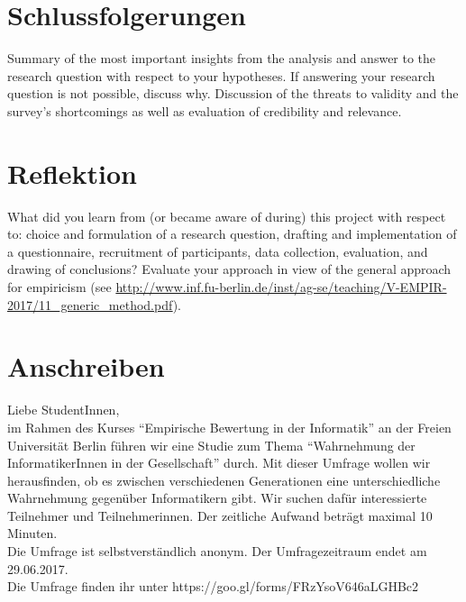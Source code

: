 \documentclass[de]{agse-empir-report}\usepackage[]{graphicx}\usepackage[]{color}
\begin{document}
\section[]{Schlussfolgerungen} \label{sec:schlussfolgerung}
Summary of the most important insights from the analysis and
answer to the research question with respect to your hypotheses.
If answering your research question is not possible, discuss why.
Discussion of the threats to validity and the survey's
shortcomings as well as evaluation of credibility and relevance.


\section[]{Reflektion} \label{sec:reflektion}

What did you learn from (or became aware of during) this project with
respect to: choice and formulation of a research question,
drafting and implementation of a questionnaire,
recruitment of participants,
data collection, evaluation, and drawing of conclusions?
Evaluate your approach in view of the general approach for
empiricism (see
\url{http://www.inf.fu-berlin.de/inst/ag-se/teaching/V-EMPIR-2017/11_generic_method.pdf}).


\nocite{*}




\appendix

\section{Anschreiben}

Liebe StudentInnen,\\
im Rahmen des Kurses “Empirische Bewertung in der Informatik” an der Freien Universität Berlin führen wir eine Studie zum Thema “Wahrnehmung der InformatikerInnen in der Gesellschaft” durch. Mit dieser Umfrage wollen wir herausfinden, ob es zwischen verschiedenen Generationen eine unterschiedliche Wahrnehmung gegenüber Informatikern gibt. Wir suchen dafür interessierte Teilnehmer und Teilnehmerinnen. Der zeitliche Aufwand beträgt maximal 10 Minuten.\\
Die Umfrage ist selbstverständlich anonym. Der Umfragezeitraum endet am 29.06.2017.\\

Die Umfrage finden ihr  unter https://goo.gl/forms/FRzYsoV646aLGHBc2 \\
\end{document}
